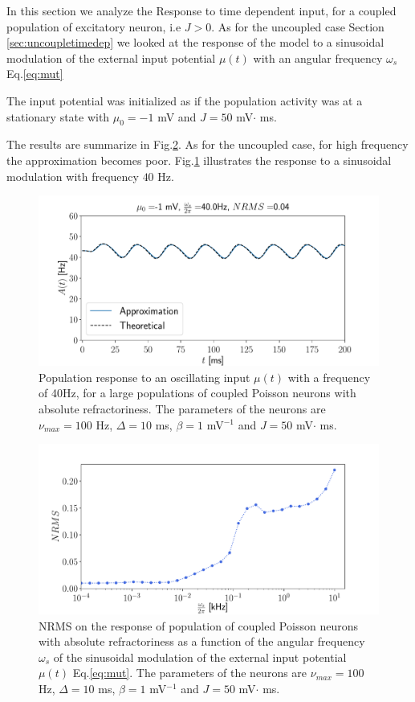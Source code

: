 \documentclass[12pt,twoside]{report}
\begin{document}
In this section we analyze the Response to time dependent input, for a coupled population of excitatory neuron, i.e $J>0$. As for the uncoupled case Section \ref{sec:uncoupletimedep} we looked at the response of the model to a sinusoidal modulation of the external input potential $\mu(t)$ with an angular frequency $\omega_s$  Eq.\eqref{eq:mut}

The input potential was initialized as if the population activity was at a stationary state with $\mu_0=-1$ mV and $J=50$ mV$\cdot$ ms.

The results are summarize in Fig.\ref{fig:NRMSo_coupled}. As for the uncoupled case, for high frequency the approximation becomes poor. Fig.\ref{fig:A_omega_t_coupled} illustrates the response to a sinusoidal modulation with frequency $40$ Hz.


\begin{figure}[h!]
	\centering
	\includegraphics[width=0.8\linewidth]{A_omega_t_coupled.pdf}
	\caption{Population response to an oscillating input $\mu(t)$ with a frequency of 40Hz, for a large populations of coupled Poisson neurons with absolute refractoriness. The parameters of the neurons are $\nu_{max}=100$ Hz, $\Delta=10$ ms, $\beta=1$ mV$^{-1}$ and  $J=50$ mV$\cdot$ ms.
	}
	\label{fig:A_omega_t_coupled}
\end{figure}


\begin{figure}[h!]
	\centering
	\includegraphics[width=0.8\linewidth]{NRMSo_coupled.pdf}
	\caption{NRMS on the response of population of coupled Poisson neurons with absolute refractoriness as a function of the angular frequency $\omega_s$  of the sinusoidal modulation of the external input potential $\mu(t)$ Eq.\eqref{eq:mut}. The parameters of the neurons are $\nu_{max}=100$ Hz, $\Delta=10$ ms, $\beta=1$ mV$^{-1}$ and  $J=50$ mV$\cdot$ ms.
	}
	\label{fig:NRMSo_coupled}
\end{figure}
\end{document}
